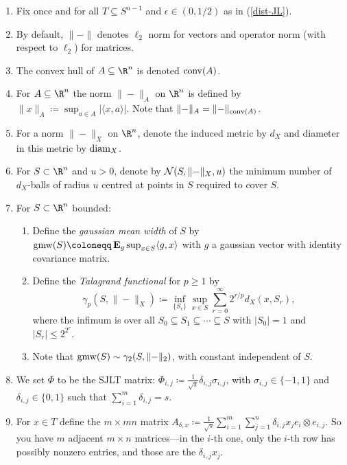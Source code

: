 \begin{enumerate}[leftmargin=*]
\item Fix once and for all $T \subseteq S^{n-1}$ and $\epsilon \in
  (0,1/2)$ as in (\ref{dist-JL}).
\item By default, $\|{-}\|$ denotes $\ell_2$ norm for vectors and
  operator norm (with respect to $\ell_2$) for matrices.
\item The convex hull of $A \subseteq \R^n$ is denoted $\operatorname{conv}(A)$.
\item For $A \subseteq \R^n$ the norm $\|{-}\|_A$ on $\R^n$ is defined
  by $\|x\|_A \coloneqq \sup_{a \in A} |\langle x,a \rangle|$. Note
  that $\|{-}\|_A = \|{-}\|_{\operatorname{conv}(A)}$.
\item For a norm $\|{-}\|_X$ on $\R^n$, denote the induced metric by
  $d_X$ and diameter in this metric by $\operatorname{diam}_X$.
\item For $S \subset \R^n$ and $u > 0$, denote by $\mathcal{N}(S, \|{-}\|_X,
  u)$ the minimum number of $d_X$-balls of radius $u$ centred at
  points in $S$ required to cover $S$.
\item For $S \subset \R^n$ bounded:
  \begin{enumerate}
  \item Define the \emph{gaussian mean width} of $S$ by $\gmw(S)
    \coloneqq \E_g \sup_{x \in S} \langle g,x \rangle$ with $g$ a
    gaussian vector with identity covariance matrix.
  \item Define the \emph{Talagrand functional} for $p \ge 1$ by
    \[
    \gamma_p(S, \|{-}\|_X) \coloneqq \inf_{\{S_r\}} \sup_{x \in S}
    \sum_{r=0}^\infty 2^{r/p} d_X(x,S_r),
    \]
    where the infimum is over all $S_0 \subseteq S_1 \subseteq \cdots
    \subseteq S$ with $|S_0| = 1$ and $|S_r| \le 2^{2^r}$.
  \item Note that $\operatorname{gmw}(S) \sim \gamma_2(S,\|{-}\|_2)$, with constant
    independent of $S$.
  \end{enumerate}
\item We set $\Phi$ to be the SJLT matrix: $\Phi_{i,j} \coloneqq
  \frac{1}{\sqrt{s}} \delta_{i,j} \sigma_{i,j}$, with $\sigma_{i,j}
  \in \{-1,1\}$ and $\delta_{i,j} \in \{0,1\}$ such that $\sum_{i=1}^m
  \delta_{i,j} = s$.
\item For $x \in T$ define the $m \times mn$ matrix $A_{\delta,x}
  \coloneqq \frac{1}{\sqrt{s}} \sum_{i=1}^m \sum_{j=1}^n \delta_{i,j}
  x_j e_i \otimes e_{i,j}$. So you have $m$ adjacent $m \times n$
  matrices---in the $i$-th one, only the $i$-th row has possibly
  nonzero entries, and those are the $\delta_{i,j}x_j$.

\end{enumerate}
